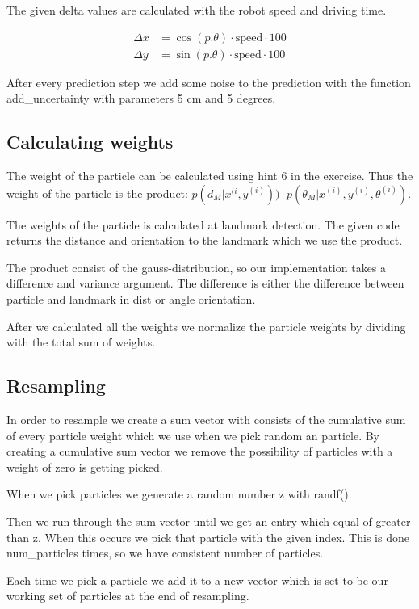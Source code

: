 \documentclass[a4paper,12pt]{article}
\begin{document}
The given delta values are calculated with the robot speed and driving time. 

\begin{align*}
\Delta x &= \cos(p.\theta)\cdot\text{speed}\cdot 100\\
\Delta y &= \sin(p.\theta)\cdot\text{speed}\cdot 100
\end{align*}

After every prediction step we add some noise to the prediction with the function add_uncertainty with parameters 5 cm and 5 degrees. 

\subsection{Calculating weights}

The weight of the particle can be calculated using hint 6 in the exercise. Thus the weight of the particle is the product: $p(d_M | x^{(i}, y^{(i)})) \cdot  p(\theta_M |x^{(i)} , y^{(i)} , \theta^{(i)} ) $. 

The weights of the particle is calculated at landmark detection. The given code returns the distance and orientation to the landmark which we use the product. 

The product consist of the gauss-distribution, so our implementation takes a difference and variance argument. The difference is either the difference between particle and landmark in dist or angle orientation. 

After we calculated all the weights we normalize the particle weights by dividing with the total sum of weights. 

\subsection{Resampling}

In order to resample we create a sum vector with consists of the cumulative sum of every particle weight which we use when we pick random an particle. By creating a cumulative sum vector we remove the possibility of particles with a weight of zero is getting picked.

When we pick particles we generate a random number z with randf().

Then we run through the sum vector until we get an entry which equal of greater than z. When this occurs we pick that particle with the given index. This is done num_particles times, so we have consistent number of particles.

Each time we pick a particle we add it to a new vector which is set to be our working set of particles at the end of resampling.
\end{document}
